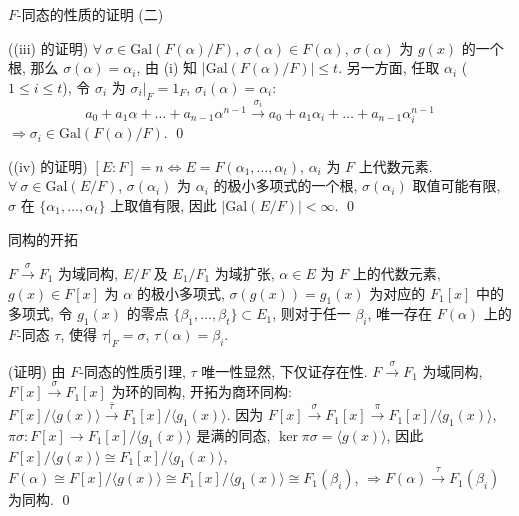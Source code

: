 
\begin{frame}{$F$-同态的性质的证明 (二)}

\startproof[bg=yellow, fg=red]((iii) 的证明)
$\forall\ \sigma \in \mathrm{Gal}(F(\alpha)/F)$,
$\sigma(\alpha) \in F(\alpha)$, $\sigma(\alpha)$ 为 $g(x)$ 的一个根,
那么 $\sigma(\alpha) = \alpha_i$, 由 (i) 知 $|\mathrm{Gal}(F(\alpha)/F)| \leq t$.
另一方面, 任取 $\alpha_i$ ($1 \leq i \leq t$),
令 $\sigma_i$ 为 $\sigma_i|_F = 1_F$, $\sigma_i(\alpha) = \alpha_i$:
\[
a_0 + a_1 \alpha + \dots + a_{n-1} \alpha^{n-1}
\xrightarrow{\ \sigma_i\ } a_0 + a_1 \alpha_i + \dots + a_{n-1} \alpha_i^{n-1}
\]
$\Longrightarrow \sigma_i \in \mathrm{Gal}(F(\alpha)/F)$.
\qed

\pause

\startproof[bg=yellow, fg=red]((iv) 的证明)
$[E:F] = n \iff E = F(\alpha_1, \dots, \alpha_t)$,
$\alpha_i$ 为 $F$ 上代数元素.
$\forall\ \sigma \in \mathrm{Gal}(E/F)$, $\sigma(\alpha_i)$ 为 $\alpha_i$
的极小多项式的一个根, $\sigma(\alpha_i)$ 取值可能有限,
$\sigma$ 在 $\{ \alpha_1, \dots, \alpha_t \}$ 上取值有限,
因此 $|\mathrm{Gal}(E/F)| < \infty$.
\qed

\end{frame}


\begin{frame}{同构的开拓}

\begin{lem}[同构的开拓]
$F \xrightarrow{\ \sigma\ } F_1$ 为域同构, $E/F$ 及 $E_1/F_1$ 为域扩张,
$\alpha \in E$ 为 $F$ 上的代数元素, $g(x) \in F[x]$ 为 $\alpha$
的极小多项式, $\sigma(g(x)) = g_1(x)$ 为对应的 $F_1[x]$ 中的多项式,
令 $g_1(x)$ 的零点 $\{ \beta_1, \dots, \beta_t \} \subset E_1$,
则对于任一 $\beta_i$, 唯一存在 $F(\alpha)$ 上的 $F$-同态 $\tau$,
使得 $\tau|_F = \sigma$, $\tau(\alpha) = \beta_i$.
\end{lem}

\startproof[bg=yellow, fg=red](证明)
由 $F$-同态的性质引理, $\tau$ 唯一性显然, 下仅证存在性.
$F \xrightarrow{\ \sigma\ } F_1$ 为域同构,
$F[x] \xrightarrow{\ \sigma\ } F_1[x]$ 为环的同构,
开拓为商环同构:
$F[x]/\langle g(x) \rangle \xrightarrow{\ \bar{\tau}\ } F_1[x]/\langle g_1(x) \rangle$.
因为 $F[x] \xrightarrow{\ \sigma\ } F_1[x] \xrightarrow{\ \pi\ } F_1[x]/\langle g_1(x) \rangle$,
$\pi\sigma: F[x] \to F_1[x]/\langle g_1(x) \rangle$ 是满的同态,
$\ker \pi\sigma = \langle g(x) \rangle$,
因此 $F[x]/\langle g(x) \rangle \cong F_1[x]/\langle g_1(x) \rangle$,
$F(\alpha) \cong F[x]/\langle g(x) \rangle \cong F_1[x]/\langle g_1(x) \rangle \cong F_1(\beta_i)$,
$\Longrightarrow F(\alpha) \xrightarrow{\ \tau\ } F_1(\beta_i)$ 为同构.
\qed

\end{frame}

